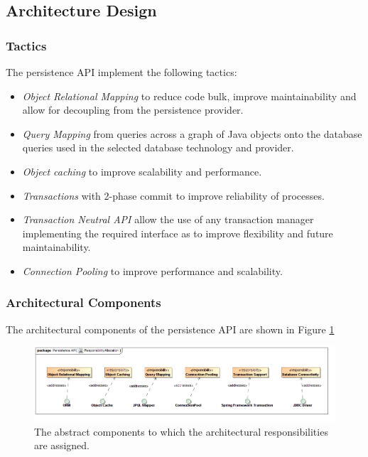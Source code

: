 \subsection{Architecture Design}
\subsubsection{Tactics}
The persistence API implement the following tactics:
\begin{itemize}
	\item \textit{Object Relational Mapping} to reduce code bulk, improve
		maintainability and allow for decoupling from the persistence
		provider.
	\item \textit{Query Mapping} from queries across a graph of Java objects
		onto the database queries used in the selected database
		technology and provider.
	\item \textit{Object caching} to improve scalability and performance.
	\item \textit{Transactions} with 2-phase commit to improve reliability
		of processes.
	\item \textit{Transaction Neutral API} allow the use of any transaction manager
		implementing the required interface as to improve flexibility and
		future maintainability.
	\item \textit{Connection Pooling} to improve performance and scalability.
\end{itemize}

\subsubsection{Architectural Components}
The architectural components of the persistence API are shown in Figure \ref{fig:persistenceResponsibilityAllocation}
\begin{figure}[H]
	\begin{center}
	\includegraphics[scale=0.5]{../Diagrams and Charts/Persistence API/ResponsibilityAllocation.jpg}
	\caption{The abstract components to which the architectural responsibilities are assigned.}
	\label{fig:persistenceResponsibilityAllocation}
	\end{center}
\end{figure}

